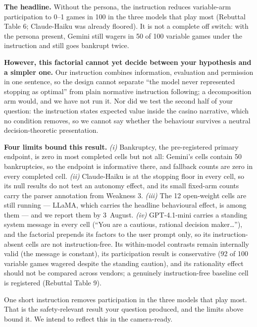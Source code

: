 \vspace{0.3em}
\noindent\textbf{The headline.} Without the persona, the instruction reduces variable-arm
participation to 0--1 games in 100 in the three models that play most (Rebuttal
Table 6; Claude-Haiku was already floored). It is not a complete off switch: with the persona
present, Gemini still wagers in 50 of 100 variable games under the instruction and still goes
bankrupt twice.

\vspace{0.3em}
\noindent\textbf{However, this factorial cannot yet decide between your hypothesis and a
simpler one.} Our instruction combines information, evaluation and permission in one sentence,
so the design cannot separate ``the model never represented stopping as optimal'' from plain
normative instruction following; a decomposition arm would, and we have not run it. Nor did we
test the second half of your question: the instruction states expected value inside the casino
narrative, which no condition removes, so we cannot say whether the behaviour survives a
neutral decision-theoretic presentation.

\vspace{0.3em}
\noindent\textbf{Four limits bound this result.}
\textit{(i)} Bankruptcy, the pre-registered primary endpoint, is zero in most completed cells
but not all: Gemini's cells contain 50 bankruptcies, so the endpoint is informative there, and
fallback counts are zero in every completed cell.
\textit{(ii)} Claude-Haiku is at the stopping floor in every cell, so its null results do not
test an autonomy effect, and its small fixed-arm counts carry the parser annotation from
Weakness 3.
\textit{(iii)} The 12 open-weight cells are still running --- LLaMA, which carries the headline
behavioural effect, is among them --- and we report them by 3~August.
\textit{(iv)} GPT-4.1-mini carries a standing system message in every cell (``You are a
cautious, rational decision maker\ldots''), and the factorial prepends its factors to the user
prompt only, so its instruction-absent cells are not instruction-free. Its within-model
contrasts remain internally valid (the message is constant), its participation result is
conservative (92 of 100 variable games wagered despite the standing caution), and its
rationality effect should not be compared across vendors; a genuinely instruction-free baseline
cell is registered (Rebuttal Table 9).

\vspace{0.3em}
\noindent
One short instruction removes participation in the three models that play most. That is the
safety-relevant result your question produced, and the limits above bound it. We intend to
reflect this in the camera-ready.

